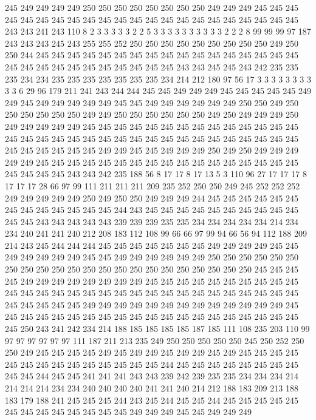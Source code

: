 245 249 249 249 249 250 250 250 250 250 250 250 250 249 249 249 245 245 245 245
245 245 245 245 245 245 245 245 245 245 245 245 245 245 245 245 245 245 243 243
241 243 110 8 2 3 3 3 3 3 2 2 5 3 3 3 3 3 3 3
3 3 3 2 2 2 8 99 99 99 97 187 243 243 243 245 243 255 255 252
250 250 250 250 250 250 250 250 250 249 250 250 244 245 245 245 245 245 245 245
245 245 245 245 245 245 245 245 245 245 245 245 245 245 245 245 245 245 245 245
245 243 243 245 245 243 242 235 235 235 234 234 235 235 235 235 235 235 235 234
214 212 180 97 56 17 3 3 3 3 3 3 3 3 3 3 6 29 96 179
211 241 243 244 244 245 245 249 249 249 245 245 245 245 245 249 249 245 249 249
249 249 249 245 245 249 249 249 249 249 249 250 250 249 250 250 250 250 250 250
249 249 250 250 250 250 250 250 249 250 249 249 249 250 249 249 249 249 249 245
245 245 245 245 245 245 245 245 245 245 245 245 245 245 245 245 245 245 245 245
245 245 245 245 245 245 245 245 245 245 245 245 245 245 245 245 245 245 249 249
245 245 249 249 249 250 249 250 249 249 249 249 249 245 245 245 245 245 245 245
245 245 245 245 245 245 245 245 245 245 245 245 245 245 243 243 242 235 188 56
8 17 17 8 17 13 5 3 110 96 27 17 17 17 8 17 17 17 28 66
97 99 111 211 211 211 209 235 252 250 250 249 245 252 252 252 249 249 249 249
249 250 249 250 250 249 249 249 244 245 245 245 245 245 245 245 245 245 245 245
245 245 244 243 245 245 245 245 245 245 245 245 245 245 245 245 243 243 243 243
243 239 239 239 235 235 234 234 234 234 234 214 234 234 240 241 241 240 212 208
183 112 108 99 66 66 97 99 94 66 56 94 112 188 209 214 243 245 244 244
244 245 245 245 245 245 245 245 249 249 249 249 245 245 249 249 249 249 249 245
245 249 249 249 249 249 249 250 250 250 250 250 250 250 250 250 250 250 250 250
250 250 250 250 250 250 250 250 250 245 245 245 245 249 249 249 249 249 249 249
249 245 245 245 245 245 245 245 245 245 245 245 245 245 245 245 245 245 245 245
245 245 245 245 245 245 245 245 245 245 245 245 245 245 245 249 249 249 249 249
249 249 249 249 249 249 249 249 245 245 245 245 245 245 245 245 245 245 245 245
245 245 245 245 245 245 245 245 245 250 243 241 242 234 214 188 185 185 185 185
187 185 111 108 235 203 110 99 97 97 97 97 97 97 111 187 211 213 235 249
250 250 250 250 250 245 250 252 250 250 249 245 245 245 245 249 245 249 249 245
249 249 245 249 245 245 245 245 245 245 245 245 245 245 245 245 245 245 244 245
245 245 245 245 245 245 245 245 245 244 245 245 241 241 241 243 243 239 242 239
235 235 234 234 234 214 214 214 214 234 234 240 240 240 240 241 241 240 214 212
188 183 209 213 188 183 179 188 241 245 245 245 244 243 245 244 245 245 244 245
245 245 245 245 245 245 245 245 245 245 245 245 249 249 249 245 245 249 249 249
